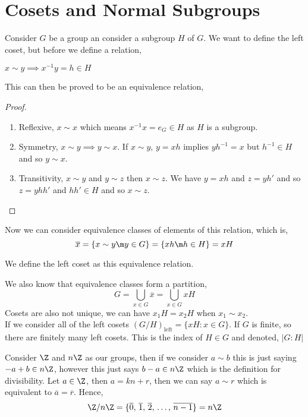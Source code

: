 \section{Cosets and Normal Subgroups}
Consider $G$ be a group an consider a subgroup $H$ of $G$. We want to define the left coset, but before we define a relation,
\begin{ndefi}[Relation]
  $x \sim y \implies x^{-1}y = h\in H$
\end{ndefi}
This can then be proved to be an equivalence relation,
\begin{proof}
  \begin{enumerate}
    \item Reflexive, $x \sim x$ which means $x^{-1} x = e_G \in H$ as $H$ is a subgroup.
    \item Symmetry, $x \sim y \implies y \sim x$. If $x \sim y$, $y = xh$ implies $yh^{-1} = x$ but $h^{-1} \in H$ and so $y \sim x$.
    \item Transitivity, $x \sim y$ and $y \sim z$ then $x \sim z$. We have $y = xh$ and $z = yh'$ and so $z = yhh'$ and $hh' \in H$ and so $x \sim z$.
  \end{enumerate}
\end{proof}
Now we can consider equivalence classes of elements of this relation, which is,
$$ \overline{x} = \{x \sim y \m y \in G\} = \{xh \m h \in H\} = xH $$

\begin{ndefi}
  We define the left coset as this equivalence relation.
\end{ndefi}
We also know that equivalence classes form a partition,
$$ G = \bigcup_{x \in G}\overline{x} = \bigcup_{x \in G} xH $$
Cosets are also not unique, we can have $x_1H = x_2H$ when $x_1 \sim x_2$.\\

If we consider all of the left cosets $(G / H)_{\text{left}} = \{xH : x \in G\}$. If $G$ is finite, so there are finitely many left cosets. This is the index of $H \in G$ and denoted, $|G : H|$


\begin{eg}
  Consider $\Z$ and $n\Z$ as our groups, then if we consider $a \sim b$ this is just saying $-a + b \in n\Z$, however this just says $b - a \in n\Z$ which is the definition for divisibility. Let $a \in\Z$, then $a = kn + r$, then we can say $a \sim r$ which is equivalent to $\overline a = \overline r$. Hence,
  $$ \Z/n\Z = \{\overline 0,\, \overline 1,\, \overline 2,\, \dots ,\, \overline{n-1}\} = n\Z $$
\end{eg}


